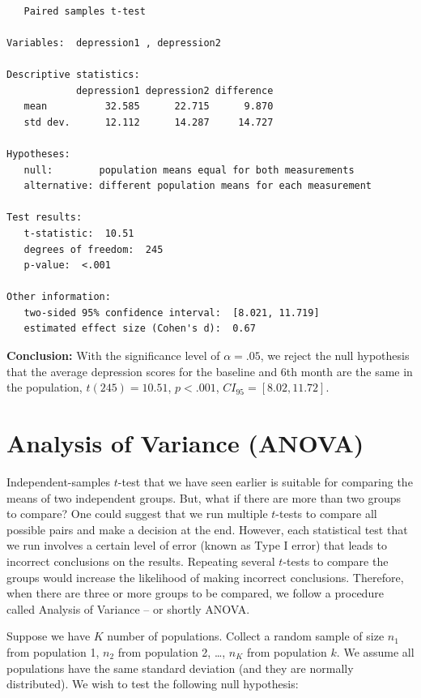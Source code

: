 \documentclass[]{book}
\begin{document}
\begin{verbatim}

   Paired samples t-test 

Variables:  depression1 , depression2 

Descriptive statistics: 
            depression1 depression2 difference
   mean          32.585      22.715      9.870
   std dev.      12.112      14.287     14.727

Hypotheses: 
   null:        population means equal for both measurements
   alternative: different population means for each measurement

Test results: 
   t-statistic:  10.51 
   degrees of freedom:  245 
   p-value:  <.001 

Other information: 
   two-sided 95% confidence interval:  [8.021, 11.719] 
   estimated effect size (Cohen's d):  0.67 
\end{verbatim}

\textbf{Conclusion:} With the significance level of \(\alpha=.05\), we reject the null hypothesis that the average depression scores for the baseline and 6th month are the same in the population, \(t(245)=10.51\), \(p < .001\), \(CI_{95}=[8.02, 11.72]\).

\hypertarget{analysis-of-variance-anova}{%
\section{Analysis of Variance (ANOVA)}\label{analysis-of-variance-anova}}

Independent-samples \(t\)-test that we have seen earlier is suitable for comparing the means of two independent groups. But, what if there are more than two groups to compare? One could suggest that we run multiple \(t\)-tests to compare all possible pairs and make a decision at the end. However, each statistical test that we run involves a certain level of error (known as Type I error) that leads to incorrect conclusions on the results. Repeating several \(t\)-tests to compare the groups would increase the likelihood of making incorrect conclusions. Therefore, when there are three or more groups to be compared, we follow a procedure called Analysis of Variance -- or shortly ANOVA.

Suppose we have \(K\) number of populations. Collect a random sample of size \(n_1\) from population 1, \(n_2\) from population 2, \ldots{}, \(n_K\) from population \(k\). We assume all populations have the same standard deviation (and they are normally distributed). We wish to test the following null hypothesis:
\end{document}

